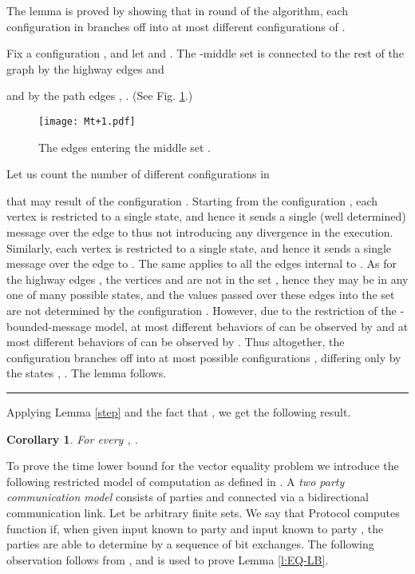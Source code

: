 \documentclass[11pt,letter]{article}
\newtheorem{corollary}[theorem]{Corollary}
\newcommand{\qed}{\rule{7pt}{7pt}}
\newenvironment{proof}{\noindent{\bf Proof}\hspace*{1em}}{\qed\bigskip}
\begin{document}
\begin{proof}
The lemma is proved by showing that in round  of the algorithm,
each configuration in  branches off into at most 
different configurations of .

Fix a configuration , and let  and 
.
The -middle set  is connected to the rest of the graph by the
highway edges  and 

and by the  path edges 
,
. (See Fig. \ref{f:Tt+1}.)
\begin{figure} [htb]
\begin{center}

\centerline{\texttt{[image: Mt+1.pdf]}}

\caption[]{
\label{f:Tt+1}
\sf
The edges entering the middle set . }
\end{center}
\end{figure}

Let us count the number of different configurations in

that may result of the configuration .
Starting from the configuration , each vertex  is
restricted
to a single state, and hence it sends a single (well determined)
message over the edge  to 
thus not introducing any divergence in the execution. Similarly, each vertex 
  is restricted to a single state, and hence it sends a single
message over the edge  to .
The same applies to all the edges internal to .
As for the highway edges , the vertices 
  and  are not in the set , 
hence they may be in any one of many possible states, 
and the values passed over these edges into the set 
are not determined by the configuration . However, due to the
restriction of the -bounded-message model, at most 
different behaviors of  can be observed by  
and at most  different behaviors of  can be observed 
by .
Thus altogether, the configuration  branches off into at most
 possible configurations 
, 
differing only by the states , 
.
The lemma follows.
\end{proof}

Applying Lemma \ref{step} and the fact that ,
we get the following result. 

\begin{corollary}
\label{cl:bound-rho}
For every , .
\end{corollary}

To prove the time lower bound for the vector equality problem we introduce 
the following restricted model of computation as defined in \cite{KUS_97}.
A {\em two party communication model} consists of parties  
and  connected via a bidirectional communication link. 
Let  be arbitrary finite sets. We say that Protocol  computes 
function   if, when given input  
known to party  and input  known to party , 
the parties are able to determine   by a sequence of bit exchanges. 
The following observation follows from \cite[1.14]{KUS_97}, and is used to prove Lemma \ref{l:EQ-LB}.
\end{document}
